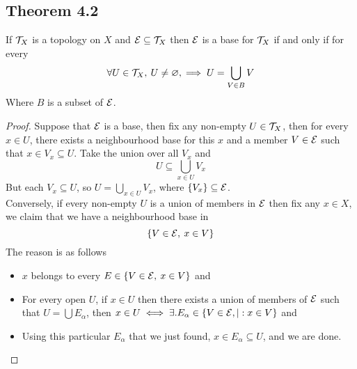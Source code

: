 \documentclass[../../main.tex]{subfiles}
\begin{document}
\subsection{Theorem 4.2}
\begin{wts}
    If $\mathcal{T}_X$ is a topology on $X$ and $\mathcal{E}\subseteq\mathcal{T}_X$ then $\mathcal{E}$ is a base for $\mathcal{T}_X$ if and only if for every 
    \[
    \forall U\in\mathcal{T}_X,\:U\neq\varnothing,\implies U=\bigcup_{V\in B}V
    \]
    Where $B$ is a subset of $\mathcal{E}$.
\end{wts}
\begin{proof}
    Suppose that $\mathcal{E}$ is a base, then fix any non-empty $U\in\mathcal{T}_X$, then for every $x\in U$, there exists a neighbourhood base for this $x$ and a member $V\in\mathcal{E}$ such that $x\in V_x\subseteq U$. Take the union over all $V_x$ and
    \[
    U\subseteq \bigcup_{x\in U}V_x
    \]
    But each $V_x\subseteq U$, so $U=\bigcup_{x\in U}V_x$, where $\{V_x\}\subseteq\mathcal{E}$.\\
    
    Conversely, if every non-empty $U$ is a union of members in $\mathcal{E}$ then fix any $x\in X$, we claim that we have a neighbourhood base in
    \[
    \{V\in\mathcal{E},\:x\in V\}
    \]
    The reason is as follows
    \begin{itemize}
        \item $x$ belongs to every $E\in \{V\in\mathcal{E},\:x\in V\}$ and
        \item For every open $U$, if $x\in U$ then there exists a union of members of $\mathcal{E}$ such that $U = \bigcup E_\alpha$, then $x\in U\iff\exists.
        E_\alpha\in\{V\in\mathcal{E},|: x\in V\}$ and
        \item Using this particular $E_\alpha$ that we just found, $x\in E_\alpha\subseteq U$, and we are done.
    \end{itemize}
\end{proof}
\end{document}
